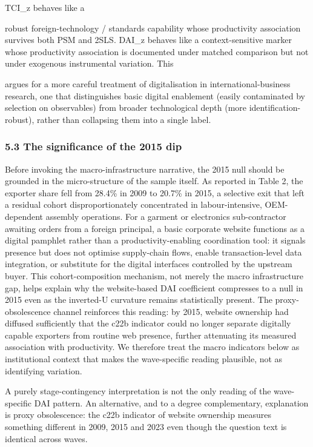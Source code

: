 \documentclass[12pt,a4paper]{article}
\begin{document}
TCI\_z behaves like a

robust foreign-technology / standards capability whose productivity
association survives both PSM and 2SLS. DAI\_z behaves like a
context-sensitive marker whose productivity association is documented
under matched comparison but not under exogenous instrumental variation.
This

argues for a more careful treatment of digitalisation in
international-business research, one that distinguishes basic digital
enablement (easily contaminated by selection on observables) from
broader technological depth (more identification-robust), rather than
collapsing them into a single label.

\hypertarget{53-the-significance-of-the-2015-dip}{%
\subsubsection{5.3 The significance of the 2015
dip}\label{53-the-significance-of-the-2015-dip}}

Before invoking the macro-infrastructure narrative, the 2015 null should
be grounded in the micro-structure of the sample itself. As reported in
Table 2, the exporter share fell from 28.4\% in 2009 to 20.7\% in 2015,
a selective exit that left a residual cohort disproportionately
concentrated in labour-intensive, OEM-dependent assembly operations. For
a garment or electronics sub-contractor awaiting orders from a foreign
principal, a basic corporate website functions as a digital pamphlet
rather than a productivity-enabling coordination tool: it signals
presence but does not optimise supply-chain flows, enable
transaction-level data integration, or substitute for the digital
interfaces controlled by the upstream buyer. This cohort-composition
mechanism, not merely the macro infrastructure gap, helps explain why
the website-based DAI coefficient compresses to a null in 2015 even as
the inverted-U curvature remains statistically present. The
proxy-obsolescence channel reinforces this reading: by 2015, website
ownership had diffused sufficiently that the c22b indicator could no
longer separate digitally capable exporters from routine web presence,
further attenuating its measured association with productivity. We
therefore treat the macro indicators below as institutional context that
makes the wave-specific reading plausible, not as identifying variation.

A purely stage-contingency interpretation is not the only reading of the
wave-specific DAI pattern. An alternative, and to a degree
complementary, explanation is proxy obsolescence: the c22b indicator of
website ownership measures something different in 2009, 2015 and 2023
even though the question text is identical across waves.
\end{document}
